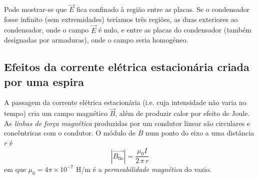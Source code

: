 \documentclass[a4paper,twoside,12pt]{article}      %
\begin{document}
Pode mostrar-se que $\vec{E}$ fica confinado à região entre as placas. Se o condensador fosse infinito (sem extremidades) teríamos três regiões, as duas exteriores ao condensador, onde o campo  $\vec{E}$  é nulo, e entre as placas do condensador (também designadas por armaduras), onde o campo seria homogéneo.


\subsection{\sf Efeitos da corrente elétrica estacionária criada por uma espira}
A passagem da corrente elétrica estacionária (i.e. cuja intensidade não varia no tempo) cria um campo magnético $\vec{B}$, além de produzir calor por efeito de Joule. As \emph{linhas de força magnética} produzidas por um condutor linear são circulares e concêntricas com o condutor. O módulo de $B$ num ponto do eixo a uma distância $r$ é
\begin{equation}
	|\vec{B_{\mathrm{fio}}}| = \frac{\mu_0 I}{2\, \pi \, r} 
\end{equation}
 em que $\mu_0 =  4 \pi× 10^{−7}$ H/m é a \emph{permeabilidade magnética}  do vazio. 

\begin{center}
\end{center}
%
\end{document}
